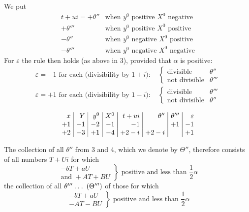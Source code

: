 We put
\[
\begin{array}{rl}
t+ui=+\theta''&\text{when }y^0\text{ positive }X^0\text{ negative}\\
+\theta'''&\text{when }y^0\text{ positive }X^0\text{ positive}\\
-\theta''&\text{when }y^0\text{ negative }X^0\text{ positive}\\
-\theta'''&\text{when }y^0\text{ negative }X^0\text{ negative}
\end{array}
\]
For $\varepsilon$ the rule then holds (as above in 3), provided that $\alpha$ is positive:
\[
\begin{aligned}
\varepsilon=-1\text{ for each (divisibility by }1+i\text{): }&\left\{\begin{array}{ll}\text{divisible}&\theta''\\\text{not divisible}&\theta'''\end{array}\right.\\[3pt]
\varepsilon=+1\text{ for each (divisibility by }1-i\text{): }&\left\{\begin{array}{ll}\text{divisible}&\theta'''\\\text{not divisible}&\theta''\end{array}\right.
\end{aligned}
\]

\[
\setlength{\arraycolsep}{4pt}
\begin{array}{r|r|r|r|r|r|r|r}
x&Y&y^0&X^0&t+ui&\theta''&\theta'''&\varepsilon\\
+1&-1&-2&-1&-1&&+1&-1\\
+2&-3&+1&-4&+2-i&+2-i&&+1
\end{array}
\]

The collection of all $\theta''$ from 3 and 4, which we denote by $\Theta''$, therefore consists of all numbers $T+Ui$ for which
\[
\left.\begin{array}{r}
-bT+aU\\
\text{and }+AT+BU
\end{array}\right\}\text{ positive and less than }\frac12\alpha
\]
the collection of all $\theta'''\mathbin{.}\mathbin{.}\mathbin{.}\;(\Theta''')$ of those for which
\[
\left.\begin{array}{r}
-bT+aU\\
-AT-BU
\end{array}\right\}\text{ positive and less than }\frac12\alpha
\]

